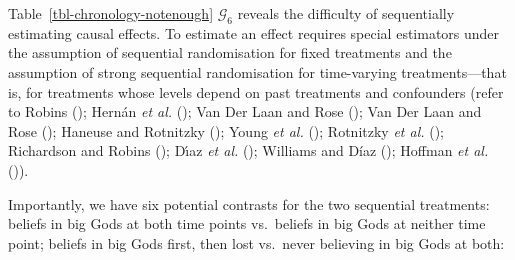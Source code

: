 \documentclass[
  single column]{article}
\begin{document}
Table~\ref{tbl-chronology-notenough} \(\mathcal{G}_6\) reveals the
difficulty of sequentially estimating causal effects. To estimate an
effect requires special estimators under the assumption of sequential
randomisation for fixed treatments and the assumption of strong
sequential randomisation for time-varying treatments---that is, for
treatments whose levels depend on past treatments and confounders (refer
to Robins (); Hernán \emph{et al.}
(); Van Der Laan and Rose
(); Van Der Laan and Rose
(); Haneuse and Rotnitzky
(); Young \emph{et al.}
(); Rotnitzky \emph{et al.}
(); Richardson and Robins
(); Dı́az \emph{et al.}
(); Williams and Díaz
(); Hoffman \emph{et al.}
()).

Importantly, we have six potential contrasts for the two sequential
treatments: beliefs in big Gods at both time points vs.~beliefs in big
Gods at neither time point; beliefs in big Gods first, then lost
vs.~never believing in big Gods at both:
\end{document}
